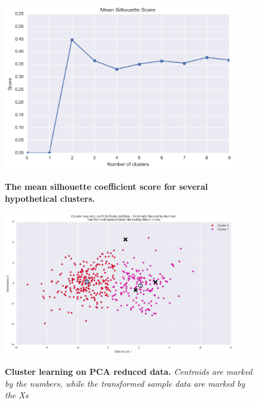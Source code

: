 \documentclass[twoside,openright,titlepage,numbers=noenddot,headinclude,%
               footinclude=true,cleardoublepage=empty,abstractoff,BCOR=5mm,%
               paper=a4,fontsize=11pt,ngerman,american]{scrreprt}
\numberwithin{theorem}{chapter}
\numberwithin{definition}{chapter}
\numberwithin{algorithm}{chapter}
\numberwithin{figure}{chapter}
\numberwithin{table}{chapter}
\numberwithin{equation}{chapter}
\begin{document}
\begin{figure}[!hbtp]
\centering
    
    \includegraphics[width=0.9\textwidth]{figures/meanSilhouetteScore}
    \label{meanSilhouetteScore}
    
    \caption{\textbf{The mean silhouette coefficient score for several hypothetical clusters.}}
\end{figure}


\begin{figure}[!hbtp]
\centering
    
    \includegraphics[width=0.9\textwidth]{figures/kMeansModelResults}
    \label{kMeansModelResults}
    
    \caption{\textbf{Cluster learning on PCA reduced data.} \textit{Centroids are marked by the numbers, while the transformed sample data are marked by the Xs}}
\end{figure}



\end{document}

